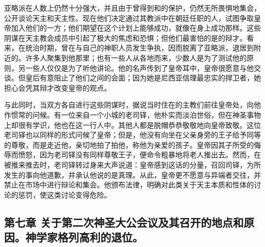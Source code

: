 亚略派在人数上仍然十分强大，并且由于曾得到和的保护，仍然无所畏惧地集会，公开谈论天主和天主性。现在他们决定通过其教派中在朝廷任职的人，试图争取皇帝加入他们的一方；他们期望在这个计划上能够成功，就像在身上成功那样。这些阴谋在天主教会成员中引起了极大的焦虑和恐惧；但他们最害怕的是的辩才。看来，在统治时期，曾在与自己的神职人员发生争执，因而脱离了亚略派，退居到附近的。许多人聚集到他那里；也有一些人从各地而来，少数人是为了测试他的原则，另一些人仅仅是为了听他讲论。他的名声传到了皇帝耳中，皇帝很愿意与他交谈。但皇后有意阻止了他们之间的会面；因为她是尼西亚信理最忠实的捍卫者，她担心会凭其辩才改变皇帝的观点。\par

与此同时，当双方各自进行这些阴谋时，据说当时住在的主教们前往皇帝处，向他作惯常的问候。有一位来自一个小城的老司铎，他朴实而淡泊世俗，但在神圣事物上却很有学识，他也在这一行人中。其他人都是脱帽恭恭敬敬地向皇帝致敬。这位老司铎也以同样的形式问候了皇帝；但是，他没有向坐在父亲身旁的王子给予同等的尊敬，而是走近他，亲切地拍了拍他，称他为亲爱的孩子。皇帝因其子所受的侮辱而愤怒，因为老司铎没有同样尊敬王子，便命令粗暴地将老人推出去。然而，在被推来推去时，老司铎转过身来大声说道：皇帝感到这话的分量，召回司铎，为所发生的事向他道歉，并承认他说的是真理。从此，皇帝更不愿意与异端者交往，并禁止在市场中进行辩论和集会。他颁布法律，明确对此类关于天主本质和性体的讨论的惩罚，使这类讨论变得危险。\par


\subsection{第七章 关于第二次神圣大公会议及其召开的地点和原因。神学家格列高利的退位。}

